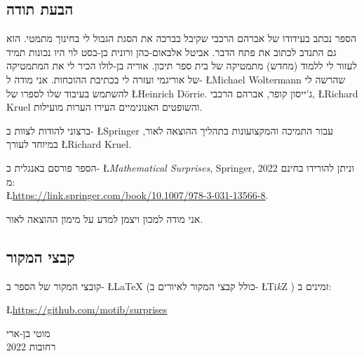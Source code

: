 
\subsection*{הבעת תודה}

הספר נכתב בעידודו של אברהם הרכבי שקיבל בברכה את הסגת הגבול לי בחינוך מתמטי. הוא גם התנדב לכתוב את פתח הדבר. אביטל אלבאום-כהן ורונית בן-בסט לוי היו נכונות תמיד לעזור לי ללמוד (מחדש) מתמטיקה של בית ספר תיכון. אוריה בן-לולו הכיר לי את המתמטיקה של אוריגמי ועזרה לי בכתיבת ההוכחות. אני מודה ל-%
\L{Michael Woltermann}
שהרשה לי להשתמש בעיבוד שלו לספרו של
\L{Heinrich D\"{o}rrie}.
ג'ייסון קופר, אברהם הרכבי,
\L{Richard Kruel}
והשופטים האנונימיים העירו הערות מועילות.

ברצוני להודות לצוות ב-%
\L{Springer}
עבור התמיכה והמקצועונות בתהליך ההוצאה לאור, במיוחד לעורך
\L{Richard Kruel}.

הספר פורסם באנגלית כ-%
\L{\textit{Mathematical Surprises}, Springer, 2022}
וניתן להורידו בחינם מ:\\
\L{\url{https://link.springer.com/book/10.1007/978-3-031-13566-8}}.

אני מודה למכון ויצמן למדע על מימון ההוצאה לאור.

\subsection*{קבצי המקור}
קובצי המקור של הספר ב-%
\L{\LaTeX{}}
(כולל קבצי המקור לאיורים ב-%
\L{Ti\textit{k}Z}%
)
זמינים ב:
\begin{center}
\L{\url{https://github.com/motib/surprises}}
\end{center}

\medskip

\begin{flushleft}
מוטי בן-ארי
\\
רחובות
2022
\end{flushleft}

\tableofcontents
